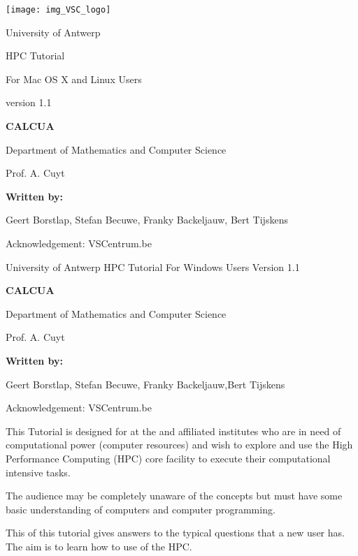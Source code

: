 \texttt{[image: img\_VSC\_logo]}

University of Antwerp

HPC Tutorial

For Mac OS X and Linux Users

version 1.1


\textbf{CALCUA}

Department of Mathematics and Computer Science

Prof. A. Cuyt



\textbf{Written by:}

Geert Borstlap, Stefan Becuwe, Franky Backeljauw, Bert Tijskens

Acknowledgement: VSCentrum.be


University of Antwerp
HPC Tutorial
For Windows Users
Version 1.1

\textbf{CALCUA}

Department of Mathematics and Computer Science

Prof. A. Cuyt



\textbf{Written by:}

Geert Borstlap, Stefan Becuwe, Franky Backeljauw,Bert Tijskens



Acknowledgement: VSCentrum.be

\textbf{}

This \hpc Tutorial is designed for  at the
 and affiliated institutes who are in need of
computational power (computer resources) and wish to explore and use the High
Performance Computing (HPC) core facility to execute their computational
intensive tasks.


The audience may be completely unaware of the \hpc concepts but must have some
basic understanding of computers and computer programming.



This  of this tutorial gives answers to the typical
questions that a new \hpc user has. The aim is to learn how to use of the
HPC.

